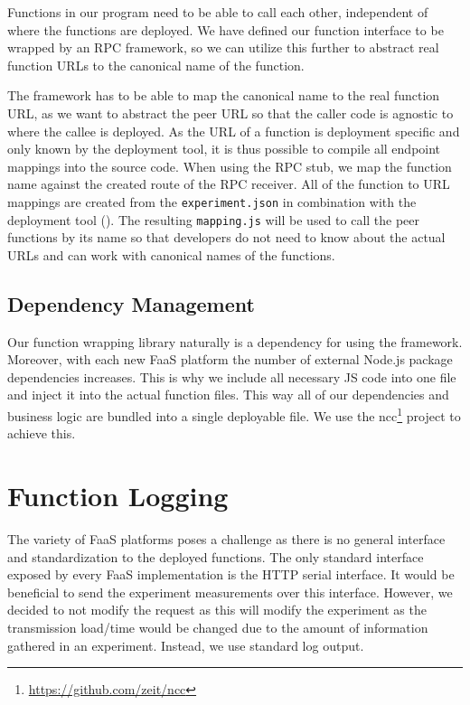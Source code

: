 \documentclass[../main.tex]{subfiles}
\begin{document}
Functions in our program need to be able to call each other, independent of where the functions are deployed. 
We have defined our function interface to be wrapped by an RPC framework, 
so we can utilize this further to abstract real function URLs to the canonical name of the function. 

The framework has to be able to map the canonical name to the real function URL, 
as we want to abstract the peer URL so that the caller code is agnostic to where the callee is deployed. 
As the URL of a function is deployment specific and only known by the deployment tool, 
it is thus possible to compile all endpoint mappings into the source code. 
When using the RPC stub, we map the function name against the created route of the RPC receiver. 
All of the function to URL mappings are created from the \texttt{experiment.json} in combination with the deployment tool
(). 
The resulting \texttt{mapping.js} will be used to call the peer functions by its name so that developers
do not need to know about the actual URLs and can work with canonical names of the functions.

\subsection{Dependency Management}%
\label{sub:designLibsDeps}

Our function wrapping library naturally is a dependency for using the framework.
Moreover, with each new FaaS platform the number of external Node.js 
package dependencies increases.
This is why we include all necessary JS code into one file and inject it into the actual function files. 
This way all of our dependencies and business logic are bundled into a single deployable file. 
We use the ncc\footnote{\url{https://github.com/zeit/ncc}} project to achieve this.

\section{Function Logging}%
\label{sec:functionLogging}

The variety of FaaS platforms poses a challenge as there is no general interface and standardization to the deployed functions. 
The only standard interface exposed by every FaaS implementation is the HTTP serial interface. 
It would be beneficial to send the experiment measurements over this interface. 
However, we decided to not modify the request as this will modify the experiment as the transmission load/time 
would be changed due to the amount of information gathered in an experiment.
Instead, we use standard log output.
\end{document}
